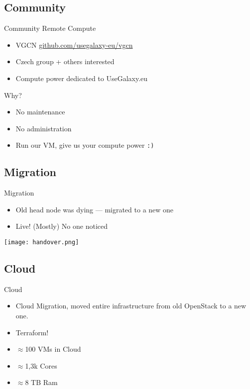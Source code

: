 \documentclass[12pt]{euslides}
\begin{document}
\subsection{Community}
\begin{frame}{Community}
	Remote Compute
	\begin{itemize}
		\item VGCN \url{github.com/usegalaxy-eu/vgcn}
		\item Czech group + others interested
		\item Compute power dedicated to UseGalaxy.eu
	\end{itemize}

	Why?
	\begin{itemize}
		\item No maintenance
		\item No administration
		\item Run our VM, give us your compute power \texttt{:)}
	\end{itemize}
\end{frame}

\subsection{Migration}
\begin{frame}{Migration}
	\begin{itemize}
		\item Old head node was dying --- migrated to a new one
		\item Live! (Mostly) No one noticed
	\end{itemize}
\texttt{[image: handover.png]}
\end{frame}

\subsection{Cloud}
\begin{frame}{Cloud}
	\begin{itemize}
		\item Cloud Migration, moved entire infrastructure from old OpenStack to a new one.
		\item Terraform!
		\item $\approx{}$100 VMs in Cloud
		\item $\approx{}$1,3k Cores
		\item $\approx{}$8 TB Ram
	\end{itemize}
\end{frame}
\end{document}
